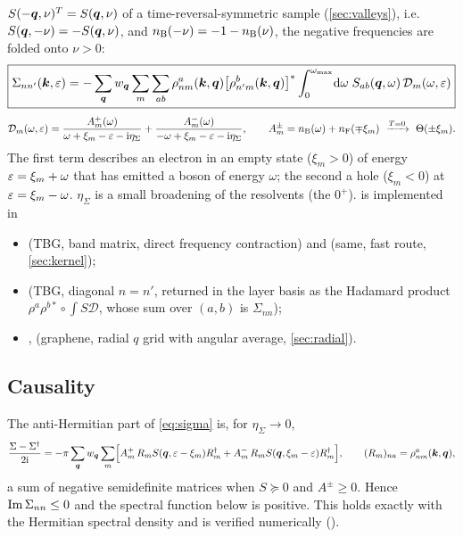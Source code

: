 $S(-\bm q,\nu)^T=S(\bm q,\nu)$ of a time-reversal-symmetric sample (\cref{sec:valleys}), i.e.\ $S(\bm q,-\nu)=-S(\bm q,\nu)$,
and $n_{\rm B}(-\nu)=-1-n_{\rm B}(\nu)$, the negative frequencies are folded onto $\nu>0$:
\begin{equation}
\boxed{\Sigma_{nn'}(\bm k,\varepsilon)=-\sum_{\bm q}w_{\bm q}\sum_m\sum_{ab}\rho^a_{nm}(\bm k,\bm q)\bigl[\rho^b_{n'm}(\bm k,\bm q)\bigr]^*
\int_0^{\omega_{\max}}\!\mathrm d\omega\;S_{ab}(\bm q,\omega)\,\mathcal D_m(\omega,\varepsilon)}
\label{eq:sigma}
\end{equation}
\begin{equation}
\mathcal D_m(\omega,\eps)=\frac{A^+_m(\omega)}{\omega+\xi_m-\eps-\ii\eta_\Sigma}+\frac{A^-_m(\omega)}{-\omega+\xi_m-\eps-\ii\eta_\Sigma},
\qquad A^\pm_m=\nB(\omega)+\nF(\mp\xi_m)\ \xrightarrow{T=0}\ \Theta(\pm\xi_m).
\label{eq:D}
\end{equation}
The first term describes an electron in an empty state ($\xi_m>0$) of energy $\varepsilon=\xi_m+\omega$ that has emitted
a boson of energy $\omega$; the second a hole ($\xi_m<0$) at $\varepsilon=\xi_m-\omega$. $\eta_\Sigma$ is a small
broadening of the resolvents (the $0^+$).  is implemented in
\begin{itemize}
\item {} (TBG, band matrix, direct frequency contraction) and
       (same, fast route, \cref{sec:kernel});
\item {} (TBG, diagonal $n=n'$, returned in the layer basis
      as the Hadamard product $\rho^a\rho^{b*}\circ\int S\mathcal D$, whose sum over $(a,b)$ is $\Sigma_{nn}$);
\item {},  (graphene,
      radial $q$ grid with angular average, \cref{sec:radial}).
\end{itemize}

\subsection{Causality}
\label{sec:passivity}

The anti-Hermitian part of \cref{eq:sigma} is, for $\eta_\Sigma\to0$,
\begin{equation}
\frac{\Sigma-\Sigma^\dagger}{2\mathrm i}=-\pi\sum_{\bm q}w_{\bm q}\sum_m\Bigl[A^+_m\,R_m S(\bm q,\varepsilon-\xi_m)R_m^\dagger
+A^-_m\,R_mS(\bm q,\xi_m-\varepsilon)R_m^\dagger\Bigr],\qquad (R_m)_{na}=\rho^a_{nm}(\bm k,\bm q),
\end{equation}
a sum of negative semidefinite matrices when $S\succeq0$ and $A^\pm\ge0$. Hence $\operatorname{Im}\Sigma_{nn}\le0$ and the
spectral function below is positive. This holds exactly with the Hermitian spectral density and is verified
numerically ().

